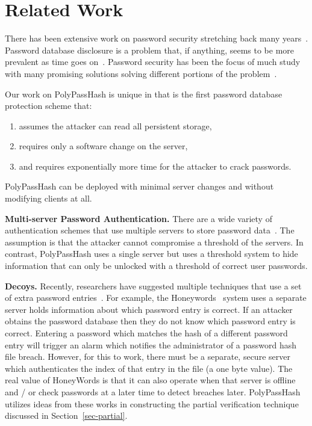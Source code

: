 \section{Related Work} \label{sec-related}


There has been extensive work on password security stretching back many
years~\cite{morris1979password,klein1990foiling, florencio2007large}.   
Password database disclosure is a problem that, if anything, seems to be
more prevalent as time goes on~\cite{clair2006password,miranteTR13,passwordresearchblog}.
Password security has been the focus of much study with many promising 
solutions solving different portions of the problem~\cite{tsai2006password}.

Our work on PolyPassHash is unique in that is the first password database
protection scheme that:
\begin{enumerate}
\item assumes the attacker can read all persistent storage,
\item requires only a software change on the server,
\item and requires exponentially more time for the attacker to crack passwords.
\end{enumerate}

PolyPassHash can be deployed with minimal server changes and without modifying 
clients at all.   

{\bf Multi-server Password Authentication.}
There are a wide variety of authentication schemes that use multiple servers
to store password data~\cite{Chai20071046,bagherzandi2011password, katz2005two}.
The assumption is that the attacker cannot compromise a threshold of
the servers.  In contrast, PolyPassHash uses a single server but uses
a threshold system to hide information that can only be unlocked
with a threshold of correct user passwords.

{\bf Decoys.}
Recently, researchers have suggested multiple techniques that use a set of 
extra password entries~\cite{Kontaxis_CCS_2013, juels2013honeywords}.  For 
example, the Honeywords~\cite{juels2013honeywords}
system uses a separate server holds information about which password entry is 
correct.   If an 
attacker obtains the password database then they do not know which password 
entry is correct.   Entering a password which matches the hash of a 
different password entry will trigger an alarm which notifies the 
administrator of a password hash file breach.   However, for this 
to work, there must be a separate, secure server which authenticates 
the index of that entry in the file (a one byte value).   
The real value of HoneyWords is that it can also operate when that server is
offline and / or check passwords at a later time to detect breaches later.
PolyPassHash utilizes ideas from these works in constructing the partial
verification technique discussed in Section~\ref{sec-partial}.

